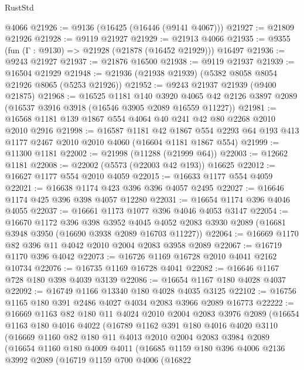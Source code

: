 \begin{lexlean}{RustStd}
\begin{coremodule}
    @4066
@21926 := @9136 (@16425 (@16446 (@9141 @4067)))
@21927 := @21809 @21926
@21928 := @9119 @21927
@21929 := @21913 @4066
@21935 := @9355 (fun (Γ : @9130) => @21928 (@21878 (@16452 @21929))) @16497
@21936 := @9243 @21927
@21937 := @21876 @16500
@21938 := @9119 @21937
@21939 := @16504 @21929
@21948 := @21936 (@21938 @21939) (@5382 @8058 @8054 @21926 @8065 (@5253 @21926))
@21952 := @9243 @21937 @21939 (@9400 @21875)
@21968 := @16525
    @1181
    @140
    @3920
    @4065
    @42
    @2126
    @3897
    @2089
    (@16537 @3916 @3918 (@16546 @3905 @2089 @16559 @11227))
@21981 := @16568 @1181 @139 @1867 @554 @4064 @40 @241 @42 @80 @2268 @2010 @2010 @2916
@21998 := @16587
    @1181
    @42
    @1867
    @554
    @2293
    @64
    @193
    @413
    @1177
    @2467
    @2010
    @2010
    @4060
    (@16604 @1181 @1867 @554)
@21999 := @11300 @1181
@22002 := @21998 (@11288 (@21999 @64))
@22003 := @12662 @1181
@22008 := @22002 (@5573 (@22003 @42 @193)) @16625
@22012 := @16627 @1177 @554 @2010 @4059
@22015 := @16633 @1177 @554 @4059
@22021 := @16638 @1174 @423 @396 @396 @4057 @2495
@22027 := @16646 @1174 @425 @396 @398 @4057 @12280
@22031 := @16654 @1174 @396 @4046 @4055
@22037 := @16661 @1173 @1077 @396 @4046 @4053 @3147
@22054 := @16670
    @1172
    @396
    @398
    @3952
    @4045
    @4052
    @2083
    @3930
    @2089
    (@16681 @3948 @3950 (@16690 @3938 @2089 @16703 @11227))
@22064 := @16669 @1170 @82 @396 @11 @4042 @2010 @2004 @2083 @3958 @2089
@22067 := @16719 @1170 @396 @4042
@22073 := @16726 @1169 @16728 @2010 @4041 @2162 @10734
@22076 := @16735 @1169 @16728 @4041
@22082 := @16646 @1167 @728 @180 @398 @4039 @3139
@22086 := @16654 @1167 @180 @4028 @4037
@22092 := @16749 @1166 @13340 @180 @4028 @4035 @3125
@22102 := @16756 @1165 @180 @391 @2486 @4027 @4034 @2083 @3966 @2089 @16773
@22222 := @16669
    @1163
    @82
    @180
    @11
    @4024
    @2010
    @2004
    @2083
    @3976
    @2089
    (@16654
      @1163
      @180
      @4016
      @4022
      (@16789
        @1162
        @391
        @180
        @4016
        @4020
        @3110
        (@16669
          @1160
          @82
          @180
          @11
          @4013
          @2010
          @2004
          @2083
          @3984
          @2089
          (@16654
            @1160
            @180
            @4009
            @4011
            (@16685
              @1159
              @180
              @396
              @4006
              @2136
              @3992
              @2089
              (@16719
                @1159
                @700
                @4006
                (@16822

\end{coremodule}
\end{lexlean}
